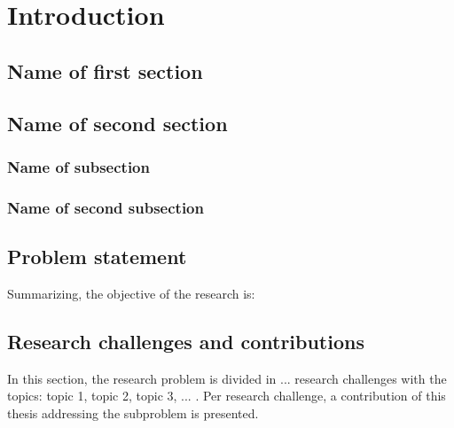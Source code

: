 \chapter{Introduction}
\label{chap: intro}
\setcounter{page}{1}


\vspace*{-2mm}
\section{Name of first section}
\label{sec: chap1 motivation}

\lipsum[9-13]


\section{Name of second section}
\label{sec: chap1 background}

\lipsum[14-18]

\subsection{Name of subsection}
\label{subsec: chap1 background2}

\lipsum[19-23]


\subsection{Name of second subsection}
\label{subsec: chap1 background3}

\lipsum[1-5]

\section{Problem statement}
\label{sec: chap1 prob statement}

\lipsum[6-8]
Summarizing, the objective of the research is:
\vspace*{3mm}


\section{Research challenges and contributions}
\label{sec: chap1 contributions}

In this section, the research problem is divided in ... research challenges with the topics: topic 1, topic 2, topic 3, ... . Per research challenge, a contribution of this thesis addressing the subproblem is presented.

